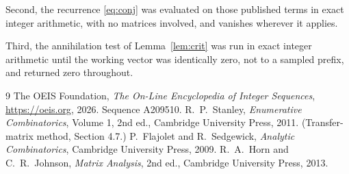 \documentclass[11pt,a4paper]{article}
\theoremstyle{plain}
\theoremstyle{definition}
\begin{document}
Second, the recurrence \eqref{eq:conj} was evaluated on those published terms in exact
integer arithmetic, with no matrices involved, and vanishes wherever it applies.

Third, the annihilation test of Lemma~\ref{lem:crit} was run in exact integer arithmetic
until the working vector was identically zero, not to a sampled prefix, and returned zero
throughout.

\begin{thebibliography}{9}
 The OEIS Foundation, \emph{The On-Line Encyclopedia of Integer
Sequences}, \url{https://oeis.org}, 2026. Sequence A209510.
 R.~P.~Stanley, \emph{Enumerative Combinatorics}, Volume 1, 2nd ed.,
Cambridge University Press, 2011. (Transfer-matrix method, Section 4.7.)
 P.~Flajolet and R.~Sedgewick, \emph{Analytic Combinatorics}, Cambridge
University Press, 2009.
 R.~A.~Horn and C.~R.~Johnson, \emph{Matrix Analysis}, 2nd ed., Cambridge
University Press, 2013.
\end{thebibliography}
\end{document}
